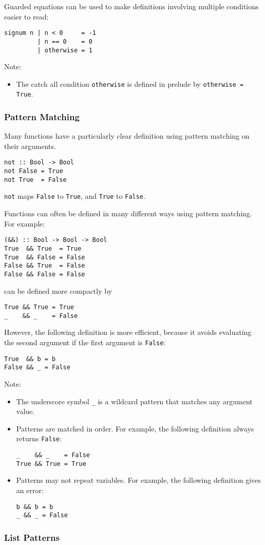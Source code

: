 \begin{multicols}{2}
Guarded equations can be used to make definitions involving multiple conditions easier to read:
\begin{lstlisting}
signum n | n < 0     = -1
         | n == 0    = 0
         | otherwise = 1
\end{lstlisting}
Note:
\begin{itemize}
  \item The catch all condition \lstinline{otherwise} is defined in prelude by \lstinline{otherwise = True}.
\end{itemize}

\subsubsection{Pattern Matching}
Many functions have a particularly clear definition using pattern matching on their arguments.
\begin{lstlisting}
not :: Bool -> Bool
not False = True
not True  = False
\end{lstlisting}
\lstinline{not} maps \lstinline{False} to \lstinline{True}, and \lstinline{True} to \lstinline{False}.

Functions can often be defined in many different ways using pattern matching. For example:
\begin{lstlisting}
(&&) :: Bool -> Bool -> Bool
True  && True  = True
True  && False = False
False && True  = False
False && False = False
\end{lstlisting}
can be defined more compactly by
\begin{lstlisting}
True && True = True
_    && _    = False
\end{lstlisting}
However, the following definition is more efficient, because it avoids evaluating the second argument if the first argument is \lstinline{False}:
\begin{lstlisting}
True  && b = b
False && _ = False
\end{lstlisting}

Note:
\begin{itemize}
  \item The underscore symbol \lstinline{_} is a wildcard pattern that matches any argument value.
  \item Patterns are matched in order. For example, the following definition always returns \lstinline{False}:
\begin{lstlisting}
_    && _    = False
True && True = True
\end{lstlisting}
  \item Patterns may not repeat variables. For example, the following definition gives an error:
\begin{lstlisting}
b && b = b
_ && _ = False
\end{lstlisting}
\end{itemize}

\subsubsection{List Patterns}


\end{multicols}
